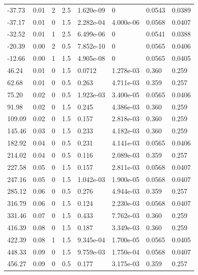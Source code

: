 \documentclass[preview]{standalone}
\begin{document}
{{\begin{tabular}{L{1.2cm}C{1.2cm} C{0.3cm}C{0.5cm} C{1.4cm}C{1.4cm} C{1.4cm}C{1.4cm}}
  -37.73  &  0.01  & 2     & 2.5 &  1.620e-09  & 0  & 0.0543 &  0.0389   \\ 
  -37.17  &  0.01  & 0     & 1.5 &  2.282e-04  & 4.000e-06  & 0.0568 &  0.0407   \\ 
  -32.52  &  0.01  & 1     & 2.5 &  6.499e-06  & 0  & 0.0541 &  0.0388   \\ 
  -20.39  &  0.00  & 2     & 0.5 &  7.852e-10  & 0  & 0.0565 &  0.0406   \\ 
  -12.66  &  0.00  & 1     & 1.5 &  4.905e-08  & 0  & 0.0565 &  0.0405   \\ 
  46.24  &  0.01  & 0     & 1.5 &  0.0712  & 1.278e-03  & 0.360 &  0.259   \\ 
  62.68  &  0.01  & 0     & 0.5 &  0.263  & 4.711e-03  & 0.359 &  0.257   \\ 
  75.20  &  0.02  & 0     & 0.5 &  1.923e-03  & 3.400e-05  & 0.0565 &  0.0406   \\ 
  91.98  &  0.02  & 0     & 1.5 &  0.245  & 4.386e-03  & 0.360 &  0.259   \\ 
  109.09  &  0.02  & 0     & 1.5 &  0.157  & 2.818e-03  & 0.360 &  0.259   \\ 
  145.46  &  0.03  & 0     & 1.5 &  0.233  & 4.182e-03  & 0.360 &  0.259   \\ 
  182.92  &  0.04  & 0     & 0.5 &  0.231  & 4.141e-03  & 0.0565 &  0.0406   \\ 
  214.02  &  0.04  & 0     & 0.5 &  0.116  & 2.089e-03  & 0.359 &  0.257   \\ 
  227.58  &  0.05  & 0     & 1.5 &  0.157  & 2.811e-03  & 0.0568 &  0.0407   \\ 
  247.16  &  0.05  & 0     & 1.5 &  1.042e-03  & 1.900e-05  & 0.0568 &  0.0407   \\ 
  285.12  &  0.06  & 0     & 0.5 &  0.276  & 4.944e-03  & 0.359 &  0.257   \\ 
  316.79  &  0.06  & 0     & 1.5 &  0.124  & 2.230e-03  & 0.0568 &  0.0407   \\ 
  331.46  &  0.07  & 0     & 1.5 &  0.433  & 7.762e-03  & 0.360 &  0.259   \\ 
  416.39  &  0.08  & 0     & 1.5 &  0.187  & 3.349e-03  & 0.360 &  0.259   \\ 
  422.39  &  0.08  & 1     & 1.5 &  9.345e-04  & 1.700e-05  & 0.0565 &  0.0405   \\ 
  448.33  &  0.09  & 0     & 1.5 &  9.759e-03  & 1.750e-04  & 0.0568 &  0.0407   \\ 
  456.27  &  0.09  & 0     & 0.5 &  0.177  & 3.175e-03  & 0.359 &  0.257   \\ 

\end{tabular}}}
\end{document}
